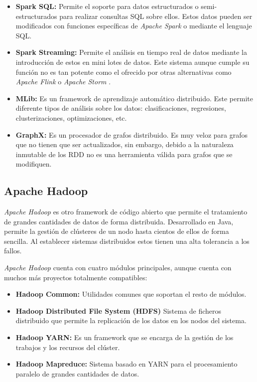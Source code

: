 \begin{itemize}
	\item \textbf{Spark SQL:} Permite el soporte para datos estructurados o semi-estructurados para realizar consultas \gls{SQL} sobre ellos. Estos datos pueden ser modificados con funciones específicas de \textit{Apache Spark} o mediante el lenguaje \gls{SQL}.
	
	\item \textbf{Spark Streaming:} Permite el análisis en tiempo real de datos mediante la introducción de estos en mini lotes de datos. Este sistema aunque cumple su función no es tan potente como el ofrecido por otras alternativas como \textit{Apache Flink} \cite{flink} o \textit{Apache Storm} \cite{storm}.
	
	\item \textbf{MLib:} Es un \gls{framework} de aprendizaje automático distribuido. Este permite diferente tipos de análisis sobre los datos: clasificaciones, regresiones, clusterizaciones, optimizaciones, etc.
	
	\item \textbf{GraphX:} Es un procesador de grafos distribuido. Es muy veloz para grafos que no tienen que ser actualizados, sin embargo, debido a la naturaleza inmutable de los \gls{RDD} no es una herramienta válida para grafos que se modifiquen.
\end{itemize}

\clearpage
\subsection{Apache Hadoop \label{hadoopEA}}
\textit{Apache Hadoop} \cite{hadoop} es otro \gls{framework} de código abierto que permite el tratamiento de grandes cantidades de datos de forma distribuida. Desarrollado en Java, permite la gestión de clústeres de un nodo hasta cientos de ellos de forma sencilla. Al establecer sistemas distribuidos estos tienen una alta tolerancia a los fallos.

\textit{Apache Hadoop} cuenta con cuatro módulos principales, aunque cuenta con muchos más proyectos totalmente compatibles: 

\begin{itemize}
	\item \textbf{Hadoop Common:} Utilidades comunes que soportan el resto de módulos.
	
	\item \textbf{Hadoop Distributed File System (\gls{HDFS})} Sistema de ficheros distribuido que permite la replicación de los datos en los nodos del sistema.
	
	\item \textbf{Hadoop YARN:} Es un \gls{framework} que se encarga de la gestión de los trabajos y los recursos del clúster.
	
	\item \textbf{Hadoop Mapreduce:} Sistema basado en YARN para el procesamiento paralelo de grandes cantidades de datos.
\end{itemize}

